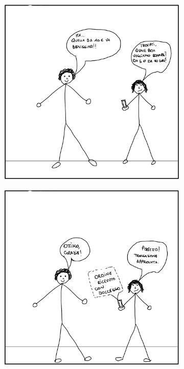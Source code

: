\documentclass{article}
\begin{document}
\begin{figure}[H]
\begin{subfigure}{0.25\textwidth}
    \end{subfigure}
    \hspace{0.02\textwidth}
    \begin{subfigure}{0.25\textwidth}
        \centering
        \includegraphics[width=\textwidth]{Storyboard/task1-img/t1.3.png}
    \end{subfigure}
    \hspace{0.02\textwidth}
    \begin{subfigure}{0.25\textwidth}
        \leftskip -4.33cm
        \includegraphics[width=\textwidth]{Storyboard/task1-img/t1.4.png}
    \end{subfigure}
\end{figure}
\end{document}
